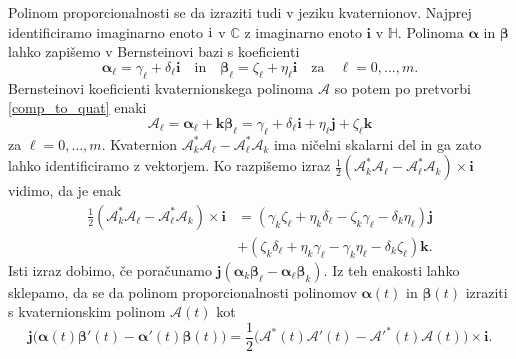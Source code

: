 \documentclass[12pt,a4paper,twoside]{article}
\newcommand{\iu}{\mathrm{i}\mkern1mu} %
\theoremstyle{definition} %
\theoremstyle{plain} %
\theoremstyle{primerstyle}
\numberwithin{equation}{section}  %
\renewcommand{\C}{\mathbb C}
\newcommand{\quat}{\mathbb H}
\newcommand{\iV}{\mathbf{i}}
\newcommand{\jV}{\mathbf{j}}
\newcommand{\kV}{\mathbf{k}}
\newcommand{\AQ}{\mathcal{A}}
\newcommand{\balpha}{\boldsymbol \alpha}
\newcommand{\bbeta}{\boldsymbol \beta}
\begin{document}
Polinom proporcionalnosti se da izraziti tudi v jeziku kvaternionov. Najprej identificiramo imaginarno enoto $\iu$ v $\C$ z imaginarno enoto $\iV$ v $\quat.$ Polinoma $\balpha$ in $\bbeta$ lahko zapišemo v Bernsteinovi bazi s koeficienti
\begin{equation*}
	\balpha_\ell=\gamma_\ell+\delta_\ell\iV\quad\text{in}\quad\bbeta_\ell=\zeta_\ell+\eta_\ell\iV\quad\text{za}\quad \ell=0,\dots,m.
\end{equation*}
Bernsteinovi koeficienti kvaternionskega polinoma $\AQ$ so potem po pretvorbi \eqref{comp_to_quat} enaki
\begin{equation*}
	\AQ_\ell=\balpha_\ell+\kV\bbeta_\ell=\gamma_\ell+\delta_\ell\iV+\eta_\ell\jV+\zeta_\ell\kV
\end{equation*}
za $\ell=0,\dots,m.$ Kvaternion $\AQ_k^*\AQ_\ell-\AQ_\ell^*\AQ_k$ ima ničelni skalarni del in ga zato lahko identificiramo z vektorjem. Ko razpišemo izraz $\frac{1}{2}(\AQ_k^*\AQ_\ell-\AQ_\ell^*\AQ_k)\times\iV$ vidimo, da je enak
\begin{align*}
	\frac{1}{2}(\AQ_k^*\AQ_\ell-\AQ_\ell^*\AQ_k)\times\iV&=(\gamma_k\zeta_\ell+\eta_k\delta_\ell-\zeta_k\gamma_\ell-\delta_k\eta_\ell)\jV\\
	&+(\zeta_k\delta_\ell+\eta_k\gamma_\ell-\gamma_k\eta_\ell-\delta_k\zeta_\ell)\kV.
\end{align*}
Isti izraz dobimo, če poračunamo $\jV(\balpha_k\bbeta_\ell-\balpha_\ell\bbeta_k).$ Iz teh enakosti lahko sklepamo, da se da polinom proporcionalnosti polinomov $\balpha(t)$ in $\bbeta(t)$ izraziti s kvaternionskim polinom $\AQ(t)$ kot
\begin{equation}
	\label{propor_kot_quat}
	\jV\big(\balpha(t)\bbeta'(t)-\balpha'(t)\bbeta(t)\big)=\frac{1}{2}\big(\AQ^*(t)\AQ'(t)-\AQ'^*(t)\AQ(t)\big)\times\iV.
\end{equation}
\end{document}
